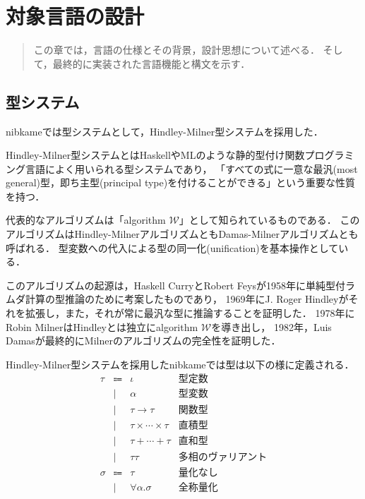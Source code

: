 \documentclass[a4paper,titlepage,report]{jsbook}
\newcommand{\algorithmW}{algorithm $\mathscr{W}$}
\begin{document}
\chapter{対象言語の設計}\label{ch:lang_design}

\begin{abstract}
この章では，言語の仕様とその背景，設計思想について述べる．
そして，最終的に実装された言語機能と構文を示す．
\end{abstract}

\section{型システム}\label{sec:型システム}
nibkameでは型システムとして，Hindley-Milner型システムを採用した．

Hindley-Milner型システムとはHaskellやMLのような静的型付け関数プログラミング言語によく用いられる型システムであり，
「すべての式に一意な最汎(most general)型，即ち主型(principal type)を付けることができる」という重要な性質を持つ．

代表的なアルゴリズムは「\algorithmW」\cite{Milner1978348}\cite{Damas:1982:PTF:582153.582176}として知られているものである．
このアルゴリズムはHindley-MilnerアルゴリズムともDamas-Milnerアルゴリズムとも呼ばれる．
型変数への代入による型の同一化(unification)を基本操作としている．

このアルゴリズムの起源は，Haskell CurryとRobert Feysが1958年に単純型付ラムダ計算の型推論のために考案したものであり，
1969年にJ. Roger Hindleyがそれを拡張し，また，それが常に最汎な型に推論することを証明した．
1978年にRobin MilnerはHindleyとは独立に\algorithmW\cite{Milner1978348}を導き出し，
1982年，Luis Damasが最終的にMilnerのアルゴリズムの完全性を証明した\cite{Damas:1982:PTF:582153.582176}．

Hindley-Milner型システムを採用したnibkameでは型は以下の様に定義される．
\begin{equation}\label{eq:type} 
\begin{array}{rcll}
    \tau    &\Coloneqq& \iota                       & \text{型定数} \\
            &\mid&  \alpha                          & \text{型変数} \\
            &\mid&  \tau \rightarrow \tau           & \text{関数型} \\
            &\mid&  \tau \times \cdots \times \tau  & \text{直積型} \\
            &\mid&  \tau + \cdots + \tau            & \text{直和型} \\
            &\mid&  \tau \tau                       & \text{多相のヴァリアント} \\
    \sigma  &\Coloneqq & \tau                       & \text{量化なし} \\
            &\mid&  \forall \alpha. \sigma          & \text{全称量化}
\end{array}
\end{equation}
\end{document}
